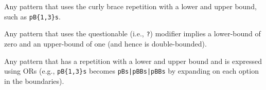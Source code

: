 \begin{description}  \itemsep -1pt
\item[D1:] Any pattern that  uses the curly brace repetition with a lower and upper bound, such as  \verb!pB{1,3}s!. 
\item[D2:] Any pattern that uses the questionable (i.e., \verb!?!) modifier implies a lower-bound of zero and an upper-bound of one (and hence is double-bounded). 
\item[D3:] Any pattern that has a repetition with a lower and upper bound and is expressed using ORs (e.g.,  \verb!pB{1,3}s! becomes \verb!pBs|pBBs|pBBs! by expanding on each option in the boundaries).

\end{description}

